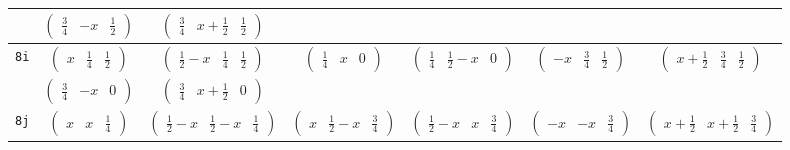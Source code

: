 \documentclass[fleqn,9pt,landscape]{jsarticle}
\begin{document}
\begin{center}
\begin{longtable}{ccccccc}
& $ \begin{pmatrix} \frac{3}{4} & - x & \frac{1}{2} \end{pmatrix} $ & $ \begin{pmatrix} \frac{3}{4} & x + \frac{1}{2} & \frac{1}{2} \end{pmatrix} $ & $  $ & $  $ & $  $ & $  $ \\ \hline
{\tt 8i} & $ \begin{pmatrix} x & \frac{1}{4} & \frac{1}{2} \end{pmatrix} $ & $ \begin{pmatrix} \frac{1}{2} - x & \frac{1}{4} & \frac{1}{2} \end{pmatrix} $ & $ \begin{pmatrix} \frac{1}{4} & x & 0 \end{pmatrix} $ & $ \begin{pmatrix} \frac{1}{4} & \frac{1}{2} - x & 0 \end{pmatrix} $ & $ \begin{pmatrix} - x & \frac{3}{4} & \frac{1}{2} \end{pmatrix} $ & $ \begin{pmatrix} x + \frac{1}{2} & \frac{3}{4} & \frac{1}{2} \end{pmatrix} $ \\
& $ \begin{pmatrix} \frac{3}{4} & - x & 0 \end{pmatrix} $ & $ \begin{pmatrix} \frac{3}{4} & x + \frac{1}{2} & 0 \end{pmatrix} $ & $  $ & $  $ & $  $ & $  $ \\ \hline
{\tt 8j} & $ \begin{pmatrix} x & x & \frac{1}{4} \end{pmatrix} $ & $ \begin{pmatrix} \frac{1}{2} - x & \frac{1}{2} - x & \frac{1}{4} \end{pmatrix} $ & $ \begin{pmatrix} x & \frac{1}{2} - x & \frac{3}{4} \end{pmatrix} $ & $ \begin{pmatrix} \frac{1}{2} - x & x & \frac{3}{4} \end{pmatrix} $ & $ \begin{pmatrix} - x & - x & \frac{3}{4} \end{pmatrix} $ & $ \begin{pmatrix} x + \frac{1}{2} & x + \frac{1}{2} & \frac{3}{4} \end{pmatrix} $ \\

\end{longtable}
\end{center}
\end{document}
